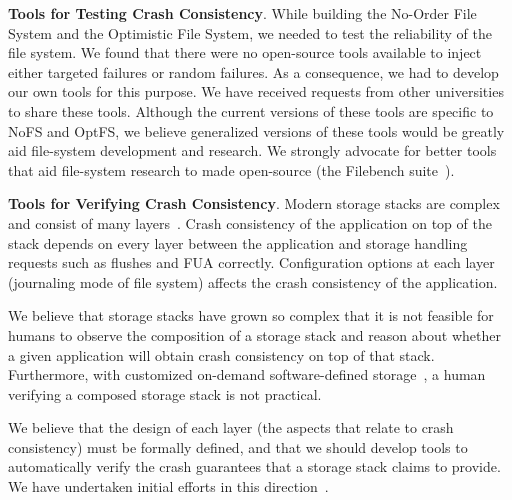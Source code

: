 \vspace{0.1in} \noindent \textbf{Tools for Testing Crash Consistency}.
While building the No-Order File System and the Optimistic File
System, we needed to test the reliability of the file system. We found
that there were no open-source tools available to inject either
targeted failures or random failures. As a consequence, we had to
develop our own tools for this purpose. We have received requests from
other universities to share these tools. Although the current versions
of these tools are specific to NoFS and OptFS, we believe generalized
versions of these tools would be greatly aid file-system development
and research. We strongly advocate for better tools that aid
file-system research to made open-source (\eg the Filebench
suite~\cite{Filebench05}).
 
\vspace{0.1in} \noindent \textbf{Tools for Verifying Crash
  Consistency}. Modern storage stacks are complex and consist of many
layers~\cite{thereska2013ioflow}. Crash consistency of the application
on top of the stack depends on every layer between the application and
storage handling requests such as flushes and FUA correctly.
Configuration options at each layer (\eg journaling mode of file
system) affects the crash consistency of the application.

We believe that storage stacks have grown so complex that it is not
feasible for humans to observe the composition of a storage stack and
reason about whether a given application will obtain crash consistency
on top of that stack. Furthermore, with customized on-demand
software-defined storage~\cite{vmware-sds, emc-sds, netapp-sds,
  vmware-sdspaper}, a human verifying a composed storage stack is not
practical.

We believe that the design of each layer (the aspects that relate to
crash consistency) must be formally defined, and that we should
develop tools to automatically verify the crash guarantees that a
storage stack claims to provide. We have undertaken initial efforts in
this direction~\cite{Alagappan+15-verification}.
  
